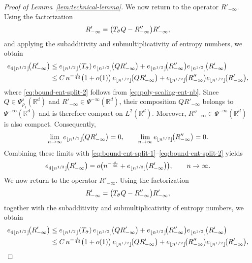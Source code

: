 \documentclass[a4paper,12pt]{article}
\let\originalleft\left
\let\originalright\right
\renewcommand{\left}{\mathopen{}\mathclose\bgroup\originalleft}
\renewcommand{\right}{\aftergroup\egroup\originalright}
\newcommand{\R}{\mathbb{R}}
\begin{document}
\begin{proof}[Proof of Lemma~\ref{lem:technical-lemma}]
We now return to the operator $R'_{-\infty}$.
Using the factorization
\[
R'_{-\infty} = \left(T_{\bar\sigma}Q - R''_{-\infty}\right)R'_{-\infty},
\]
and applying the subadditivity and submultiplicativity of entropy numbers, we obtain
\begin{align}
e_{4\lfloor n^{1/2}\rfloor}\!\left(R'_{-\infty}\right)
&\le
e_{\lfloor n^{1/2}\rfloor}(T_{\bar\sigma})\,
e_{\lfloor n^{1/2}\rfloor}\!\left(Q R'_{-\infty}\right)
+
e_{\lfloor n^{1/2}\rfloor}\!\left(R''_{-\infty}\right)
e_{\lfloor n^{1/2}\rfloor}\!\left(R'_{-\infty}\right)
\label{eq:bound-ent-split-1}\\
&\le
C\,n^{-\frac{s}{4d}}\bigl(1+o(1)\bigr)\,
e_{\lfloor n^{1/2}\rfloor}\!\left(Q R'_{-\infty}\right)
+
e_{\lfloor n^{1/2}\rfloor}\!\left(R''_{-\infty}\right)
e_{\lfloor n^{1/2}\rfloor}\!\left(R'_{-\infty}\right),
\label{eq:bound-ent-split-2}
\end{align}
where \eqref{eq:bound-ent-split-2} follows from \eqref{eq:poly-scaling-ent-nb}.
Since $Q\in\Psi^{s}_{\rho_1}(\R^d)$ and $R'_{-\infty}\in\Psi^{-\infty}(\R^d)$,
their composition $Q R'_{-\infty}$ belongs to $\Psi^{-\infty}(\R^d)$ and is therefore compact on $L^2(\R^d)$.
Moreover, $R''_{-\infty}\in\Psi^{-\infty}(\R^d)$ is also compact.
Consequently,
\[
\lim_{n\to\infty}
e_{\lfloor n^{1/2}\rfloor}\!\left(Q R'_{-\infty}\right)
=
0,
\qquad
\lim_{n\to\infty}
e_{\lfloor n^{1/2}\rfloor}\!\left(R''_{-\infty}\right)
=
0.
\]
Combining these limits with \eqref{eq:bound-ent-split-1}–\eqref{eq:bound-ent-split-2} yields
\begin{equation}\label{eq:R-fast-decay}
e_{4\lfloor n^{1/2}\rfloor}\!\left(R'_{-\infty}\right)
=
o \left(n^{-\frac{s}{4d}} + e_{\lfloor n^{1/2}\rfloor}\!\left(R'_{-\infty}\right)\right),
\qquad n\to\infty.
\end{equation}
\iffalse 
We now return to the operator $R'_{-\infty}$.
Using the factorization
\[
R'_{-\infty} = \left(T_{\bar\sigma}Q -R''_{-\infty} \right)R'_{-\infty},
\]
together with the subadditivity and submultiplicativity of entropy numbers, we obtain
\begin{align}
e_{4\lfloor n^{1/2}\rfloor}\!\left(R'_{-\infty}\right)
&\le
e_{\lfloor n^{1/2}\rfloor}(T_{\bar\sigma})\,
e_{\lfloor n^{1/2}\rfloor}\!\left(Q R'_{-\infty}\right)
+ e_{\lfloor n^{1/2}\rfloor}\!\left(R''_{-\infty}\right)e_{\lfloor n^{1/2}\rfloor}\!\left(R'_{-\infty}\right)
\label{eq:bound-ent-split-1}\\
&\le
C\,n^{-\frac{s}{4d}}\bigl(1+o(1)\bigr)\,
e_{\lfloor n^{1/2}\rfloor}\!\left(Q R'_{-\infty}\right)
+ e_{\lfloor n^{1/2}\rfloor}\!\left(R''_{-\infty}\right)e_{\lfloor n^{1/2}\rfloor}\!\left(R'_{-\infty}\right),

\end{align}
\end{proof}
\end{document}
